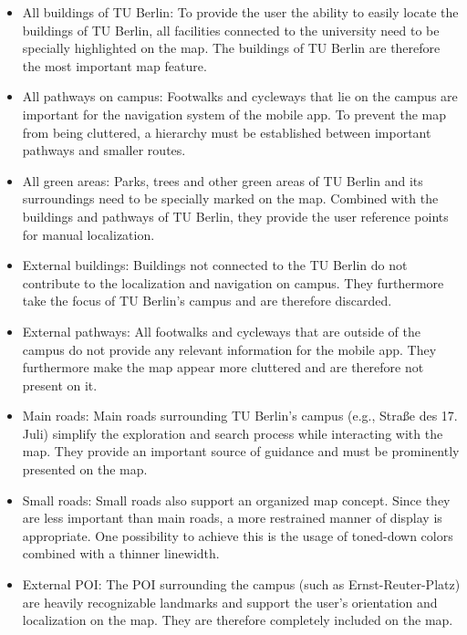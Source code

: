 \begin{itemize}
    \item All buildings of TU Berlin: To provide the user the ability to easily locate the buildings of TU Berlin, all facilities connected to the university need to be specially highlighted on the map. The buildings of TU Berlin are therefore the most important map feature.
    \item All pathways on campus: Footwalks and cycleways that lie on the campus are important for the navigation system of the mobile app. To prevent the map from being cluttered, a hierarchy must be established between important pathways and smaller routes.
    \item All green areas: Parks, trees and other green areas of TU Berlin and its surroundings need to be specially marked on the map. Combined with the buildings and pathways of TU Berlin, they provide the user reference points for manual localization.
    \item External buildings: Buildings not connected to the TU Berlin do not contribute to the localization and navigation on campus. They furthermore take the focus of TU Berlin's campus and are therefore discarded. %
    \item External pathways: All footwalks and cycleways that are outside of the campus do not provide any relevant information for the mobile app. They furthermore make the map appear more cluttered and are therefore not present on it.
    \item Main roads: Main roads surrounding TU Berlin's campus (e.g., Straße des 17. Juli) simplify the exploration and search process while interacting with the map. They provide an important source of guidance and must be prominently presented on the map.
    \item Small roads: Small roads also support an organized map concept. Since they are less important than main roads, a more restrained manner of display is appropriate. One possibility to achieve this is the usage of toned-down colors combined with a thinner linewidth.
    \item External POI: The POI surrounding the campus (such as Ernst-Reuter-Platz) are heavily recognizable landmarks and support the user's orientation and localization on the map. They are therefore completely included on the map.
\end{itemize}

